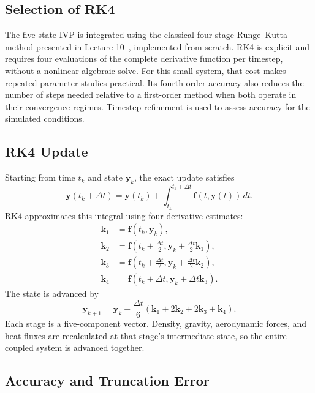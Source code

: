 \documentclass[conf]{new-aiaa}
\begin{document}
\subsection{Selection of RK4}

The five-state IVP is integrated using the classical four-stage Runge--Kutta
method presented in Lecture 10~\cite{lecture10}, implemented from scratch. RK4 is explicit and requires four evaluations
of the complete derivative function per timestep, without a nonlinear algebraic
solve. For this small system, that cost makes repeated parameter studies
practical. Its fourth-order accuracy also reduces the number of steps needed
relative to a first-order method when both operate in their convergence regimes.
Timestep refinement is used to assess accuracy for the simulated conditions.

\subsection{RK4 Update}

Starting from time $t_k$ and state $\mathbf y_k$, the exact update satisfies
\begin{equation}
\mathbf y(t_k+\Delta t)
=\mathbf y(t_k)+\int_{t_k}^{t_k+\Delta t}\mathbf f(t,\mathbf y(t))\,dt.
\end{equation}
RK4 approximates this integral using four derivative estimates:
\begin{align}
\mathbf k_1 &= \mathbf f(t_k,\mathbf y_k), \\
\mathbf k_2 &= \mathbf f\left(t_k+\frac{\Delta t}{2},
                    \mathbf y_k+\frac{\Delta t}{2}\mathbf k_1\right), \\
\mathbf k_3 &= \mathbf f\left(t_k+\frac{\Delta t}{2},
                    \mathbf y_k+\frac{\Delta t}{2}\mathbf k_2\right), \\
\mathbf k_4 &= \mathbf f(t_k+\Delta t,\mathbf y_k+\Delta t\mathbf k_3).
\end{align}
The state is advanced by
\begin{equation}
\mathbf y_{k+1}=\mathbf y_k+
\frac{\Delta t}{6}(\mathbf k_1+2\mathbf k_2+2\mathbf k_3+\mathbf k_4).
\end{equation}
Each stage is a five-component vector. Density, gravity, aerodynamic forces,
and heat fluxes are recalculated at that stage's intermediate state, so the
entire coupled system is advanced together.


\subsection{Accuracy and Truncation Error}
\end{document}
